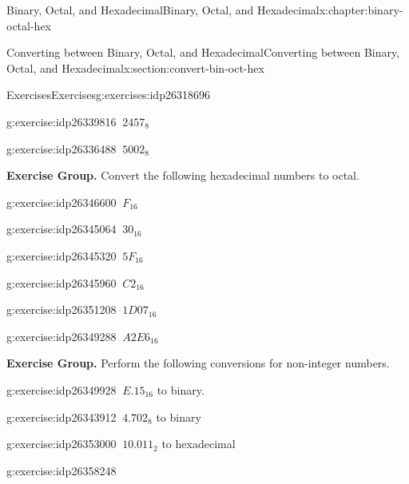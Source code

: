 \documentclass[twoside,10pt,]{book}
\numberwithin{equation}{section}
\begin{document}
\begin{chapterptx}{Binary, Octal, and Hexadecimal}{}{Binary, Octal, and Hexadecimal}{}{}{x:chapter:binary-octal-hex}
\begin{sectionptx}{Converting between Binary, Octal, and Hexadecimal}{}{Converting between Binary, Octal, and Hexadecimal}{}{}{x:section:convert-bin-oct-hex}
\begin{exercises-subsection}{Exercises}{}{Exercises}{}{}{g:exercises:idp26318696}
\begin{exercisegroup}
\begin{divisionexerciseeg}{29}{}{}{g:exercise:idp26339816}
\(\ 2457_8\)\end{divisionexerciseeg}%
\begin{divisionexerciseeg}{30}{}{}{g:exercise:idp26336488}%
\(\ 5002_8\)\end{divisionexerciseeg}%
\end{exercisegroup}
\par\medskip\noindent
\par\medskip\noindent%
\textbf{Exercise Group.}\space\space%
Convert the following hexadecimal numbers to octal.\begin{exercisegroup}
\begin{divisionexerciseeg}{31}{}{}{g:exercise:idp26346600}%
\(\ F_{16}\)\end{divisionexerciseeg}%
\begin{divisionexerciseeg}{32}{}{}{g:exercise:idp26345064}%
\(\ 30_{16}\)\end{divisionexerciseeg}%
\begin{divisionexerciseeg}{33}{}{}{g:exercise:idp26345320}%
\(\ 5F_{16}\)\end{divisionexerciseeg}%
\begin{divisionexerciseeg}{34}{}{}{g:exercise:idp26345960}%
\(\ C2_{16}\)\end{divisionexerciseeg}%
\begin{divisionexerciseeg}{35}{}{}{g:exercise:idp26351208}%
\(\ 1D07_{16}\)\end{divisionexerciseeg}%
\begin{divisionexerciseeg}{36}{}{}{g:exercise:idp26349288}%
\(\ A2E6_{16}\)\end{divisionexerciseeg}%
\end{exercisegroup}
\par\medskip\noindent
\par\medskip\noindent%
\textbf{Exercise Group.}\space\space%
Perform the following conversions for non-integer numbers.\begin{exercisegroup}
\begin{divisionexerciseeg}{37}{}{}{g:exercise:idp26349928}%
\(\ E.15_{16}\) to binary.\end{divisionexerciseeg}%
\begin{divisionexerciseeg}{38}{}{}{g:exercise:idp26343912}%
\(\ 4.702_8\) to binary\end{divisionexerciseeg}%
\begin{divisionexerciseeg}{39}{}{}{g:exercise:idp26353000}%
\(\ 10.011_2\) to hexadecimal\end{divisionexerciseeg}%
\begin{divisionexerciseeg}{40}{}{}{g:exercise:idp26358248}%

\end{divisionexerciseeg}
\end{exercisegroup}
\end{exercises-subsection}
\end{sectionptx}
\end{chapterptx}
\end{document}
